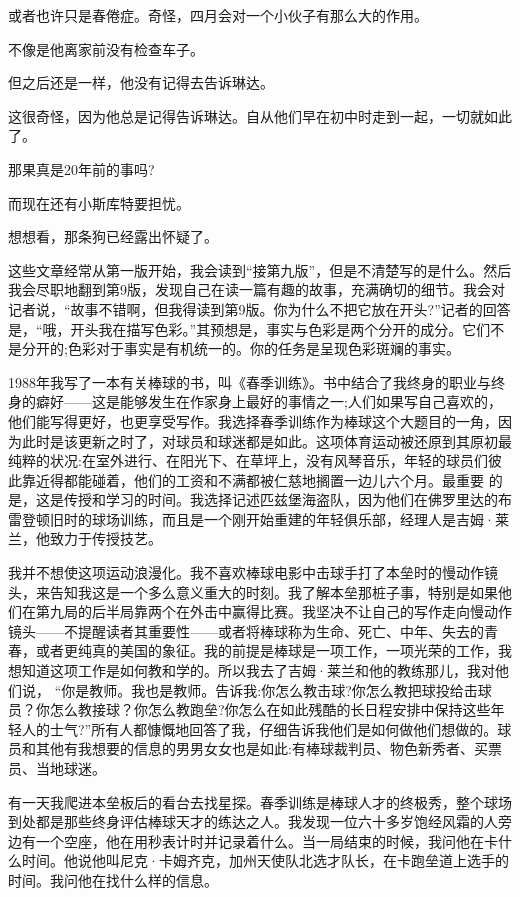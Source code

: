 或者也许只是春倦症。奇怪，四月会对一个小伙子有那么大的作用。

不像是他离家前没有检查车子。

但之后还是一样，他没有记得去告诉琳达。

这很奇怪，因为他总是记得告诉琳达。自从他们早在初中时走到一起，一切就如此了。

那果真是20年前的事吗?

而现在还有小斯库特要担忧。

想想看，那条狗已经露出怀疑了。

这些文章经常从第一版开始，我会读到“接第九版”，但是不清楚写的是什么。然后我会尽职地翻到第9版，发现自己在读一篇有趣的故事，充满确切的细节。我会对记者说，“故事不错啊，但我得读到第9版。你为什么不把它放在开头?”记者的回答是，“哦，开头我在描写色彩。”其预想是，事实与色彩是两个分开的成分。它们不是分开的;色彩对于事实是有机统一的。你的任务是呈现色彩斑斓的事实。

1988年我写了一本有关棒球的书，叫《春季训练》。书中结合了我终身的职业与终身的癖好——这是能够发生在作家身上最好的事情之一;人们如果写自己喜欢的，他们能写得更好，也更享受写作。我选择春季训练作为棒球这个大题目的一角，因为此时是该更新之时了，对球员和球迷都是如此。这项体育运动被还原到其原初最纯粹的状况:在室外进行、在阳光下、在草坪上，没有风琴音乐，年轻的球员们彼此靠近得都能碰着，他们的工资和不满都被仁慈地搁置一边儿六个月。最重要 的是，这是传授和学习的时间。我选择记述匹兹堡海盗队，因为他们在佛罗里达的布雷登顿旧时的球场训练，而且是一个刚开始重建的年轻俱乐部，经理人是吉姆·莱兰，他致力于传授技艺。

我并不想使这项运动浪漫化。我不喜欢棒球电影中击球手打了本垒时的慢动作镜头，来告知我这是一个多么意义重大的时刻。我了解本垒那桩子事，特别是如果他们在第九局的后半局靠两个在外击中赢得比赛。我坚决不让自己的写作走向慢动作镜头——不提醒读者其重要性——或者将棒球称为生命、死亡、中年、失去的青春，或者更纯真的美国的象征。我的前提是棒球是一项工作，一项光荣的工作，我想知道这项工作是如何教和学的。所以我去了吉姆·莱兰和他的教练那儿，我对他们说， “你是教师。我也是教师。告诉我:你怎么教击球?你怎么教把球投给击球员？你怎么教接球？你怎么教跑垒?你怎么在如此残酷的长日程安排中保持这些年轻人的士气?”所有人都慷慨地回答了我，仔细告诉我他们是如何做他们想做的。球员和其他有我想要的信息的男男女女也是如此:有棒球裁判员、物色新秀者、买票员、当地球迷。

有一天我爬进本垒板后的看台去找星探。春季训练是棒球人才的终极秀，整个球场到处都是那些终身评估棒球天才的练达之人。我发现一位六十多岁饱经风霜的人旁边有一个空座，他在用秒表计时并记录着什么。当一局结束的时候，我问他在卡什么时间。他说他叫尼克·卡姆齐克，加州天使队北选才队长，在卡跑垒道上选手的时间。我问他在找什么样的信息。

